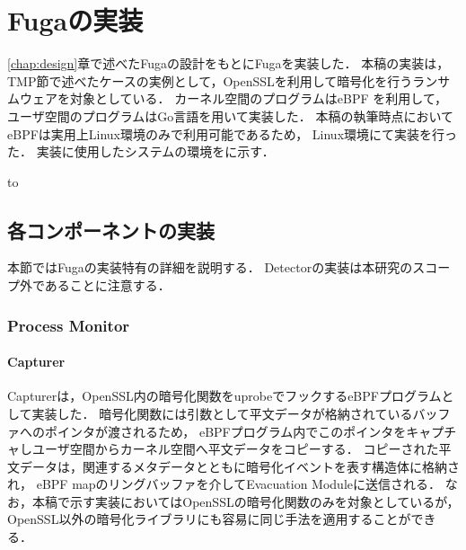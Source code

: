 \chapter{Fugaの実装}
\ref{chap:design}章で述べたFugaの設計をもとにFugaを実装した．
本稿の実装は，TMP節で述べたケースの実例として，OpenSSLを利用して暗号化を行うランサムウェアを対象としている．
カーネル空間のプログラムはeBPF \cite{WhatiseB81:online} を利用して，
ユーザ空間のプログラムはGo言語を用いて実装した．
本稿の執筆時点においてeBPFは実用上Linux環境のみで利用可能であるため，
Linux環境にて実装を行った．
実装に使用したシステムの環境をに示す．
\begin{table}[tb]
  \caption{Implementation environment for Fuga.}
  \label{tab:impl-env}
  \hbox to
\end{table}

\section{各コンポーネントの実装}
本節ではFugaの実装特有の詳細を説明する．
Detectorの実装は本研究のスコープ外であることに注意する．

\subsection{Process Monitor}
\subsubsection{Capturer}
Capturerは，OpenSSL内の暗号化関数をuprobeでフックするeBPFプログラムとして実装した．
暗号化関数には引数として平文データが格納されているバッファへのポインタが渡されるため，
eBPFプログラム内でこのポインタをキャプチャしユーザ空間からカーネル空間へ平文データをコピーする．
コピーされた平文データは，関連するメタデータとともに暗号化イベントを表す構造体に格納され，
eBPF mapのリングバッファを介してEvacuation Moduleに送信される．
なお，本稿で示す実装においてはOpenSSLの暗号化関数のみを対象としているが，
OpenSSL以外の暗号化ライブラリにも容易に同じ手法を適用することができる．

